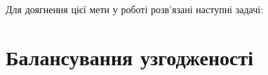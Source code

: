 \documentclass[14pt]{vakthesis}
\begin{document}
Для доягнення цієї мети у роботі розв'язані наступні задачі:
%
%
%
%
%
%
%

\chapter{Балансування узгодженості}
\end{document}
